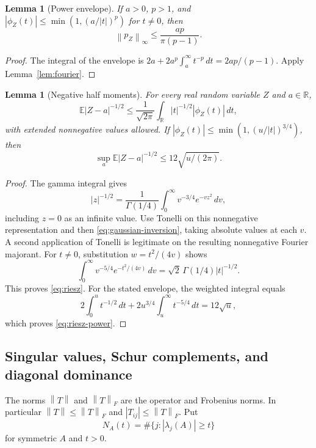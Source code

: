\documentclass[11pt]{article}
\numberwithin{equation}{section}
\newtheorem{lemma}[theorem]{Lemma}
\theoremstyle{definition}\newtheorem{definition}[theorem]{Definition}
\theoremstyle{remark}\newtheorem{remark}[theorem]{Remark}
\newcommand{\R}{\mathbb R}\newcommand{\E}{\mathbb E}\newcommand{\PP}{\mathbb P}
\newcommand{\1}{\mathbf 1}\newcommand{\diag}{\operatorname{diag}}
\newcommand{\norm}[1]{\left\lVert#1\right\rVert}\newcommand{\abs}[1]{\left|#1\right|}
\begin{document}
\begin{lemma}[Power envelope]\label{lem:envelope}
If $a>0$, $p>1$, and $|\phi_Z(t)|\le\min(1,(a/|t|)^p)$ for $t\ne0$, then
\begin{equation}\label{eq:envelope}
 \norm{p_Z}_\infty\le\frac{ap}{\pi(p-1)}.
\end{equation}
\end{lemma}
\begin{proof}
The integral of the envelope is $2a+2a^p\int_a^\infty t^{-p}\,dt=2ap/(p-1)$. Apply Lemma~\ref{lem:fourier}.
\end{proof}

\begin{lemma}[Negative half moments]\label{lem:riesz}
For every real random variable $Z$ and $a\in\R$,
\begin{equation}\label{eq:riesz}
 \E|Z-a|^{-1/2}\le\frac1{\sqrt{2\pi}}
 \int_\R |t|^{-1/2}|\phi_Z(t)|\,dt,
\end{equation}
with extended nonnegative values allowed. If
$|\phi_Z(t)|\le\min(1,(u/|t|)^{3/4})$, then
\begin{equation}\label{eq:riesz-power}
 \sup_a\E|Z-a|^{-1/2}\le12\sqrt{u/(2\pi)}.
\end{equation}
\end{lemma}
\begin{proof}
The gamma integral gives
\[
 |z|^{-1/2}=\frac1{\Gamma(1/4)}\int_0^\infty v^{-3/4}e^{-vz^2}\,dv,
\]
including $z=0$ as an infinite value. Use Tonelli on this nonnegative representation and then \eqref{eq:gaussian-inversion}, taking absolute values at each $v$. A second application of Tonelli is legitimate on the resulting nonnegative Fourier majorant. For $t\ne0$, substitution $w=t^2/(4v)$ shows
\[
 \int_0^\infty v^{-5/4}e^{-t^2/(4v)}\,dv
 =\sqrt2\,\Gamma(1/4)|t|^{-1/2}.
\]
This proves \eqref{eq:riesz}. For the stated envelope, the weighted integral equals
\[
 2\int_0^u t^{-1/2}\,dt+
 2u^{3/4}\int_u^\infty t^{-5/4}\,dt=12\sqrt u,
\]
which proves \eqref{eq:riesz-power}.
\end{proof}

\subsection{Singular values, Schur complements, and diagonal dominance}
The norms $\norm T$ and $\norm T_F$ are the operator and Frobenius norms. In particular $\norm T\le\norm T_F$ and $|T_{ij}|\le\norm T_F$. Put
\[
 N_A(t)=\#\{j:|\lambda_j(A)|\ge t\}
\]
for symmetric $A$ and $t>0$.
\end{document}
